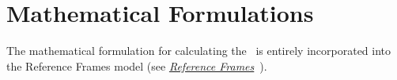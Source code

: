 %
%
% 
%

\section{Mathematical Formulations}

The mathematical formulation for calculating the \RelativeDesc\ is entirely incorporated into the Reference Frames model (see \href{file:\JEODHOME/models/utils/ref_frames/docs/ref_frames.pdf}{\em Reference Frames}~\cite{dynenv:REFFRAMES}).